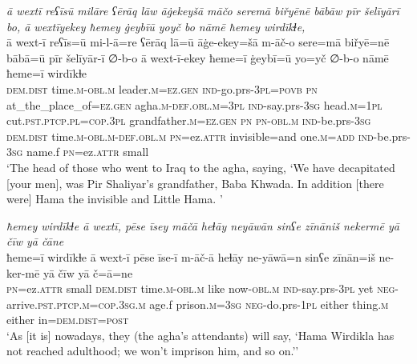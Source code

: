\ea \label{BP.122}
\textit{ā wextī reʕīsū milāre ʕērāq lāw āġekeyšā māčo seremā biřyēnē bābāw pīr šelīyārī bo, ā wextīyekey ħemey ġeybīū yoyč bo nāmē ħemey wirdīkɫe,} \\ 
\gll ā wext-ī reʕīs=ū mi-l-ā=re ʕērāq lā=ū āġe-ekey=šā m-āč-o sere=mā biřyē=nē bābā=ū pīr šelīyār-ī ∅-b-o ā wext-ī-ekey ħeme=ī ġeybī=ū yo=yč ∅-b-o nāmē ħeme=ī wirdīkɫe \\ 
 \textsc{dem.dist} time\textsc{.m}\textsc{-obl}\textsc{.m} leader\textsc{.m}\textsc{=ez.gen} \textsc{ind-}go.prs\textsc{-3pl}\textsc{=\textsc{povb}} \textsc{pn} at\_the\_place\_of\textsc{=ez.gen} agha\textsc{.m}\textsc{-def}\textsc{.obl}\textsc{.m}\textsc{=3pl} \textsc{ind-}say.prs\textsc{-3sg} head\textsc{.m}\textsc{=\textsc{1pl}} cut\textsc{.pst}\textsc{.ptcp}\textsc{.pl}\textsc{=cop}\textsc{.3pl} grandfather\textsc{.m}\textsc{=ez.gen} \textsc{pn} \textsc{pn}\textsc{-obl}\textsc{.m} \textsc{ind-}be.prs\textsc{-3sg} \textsc{dem.dist} time\textsc{.m}\textsc{-obl}\textsc{.m}\textsc{-def}\textsc{.obl}\textsc{.m} \textsc{pn}=ez.\textsc{attr} invisible=and one\textsc{.m}\textsc{=add} \textsc{ind-}be.prs\textsc{-3sg} name.f \textsc{pn}=ez.\textsc{attr} small \\ 
\glt `The head of those who went to Iraq to the agha, saying, ‘We have decapitated [your men], was Pir Shaliyar’s grandfather, Baba Khwada. In addition [there were] Hama the invisible and Little Hama. '
\z 
 
\ea \label{BP.123}
\textit{ħemey wirdīkɫe ā wextī, pēse īsey māčā heɫāy neyāwān sinʕe zīnāniš nekermē yā čīw yā čāne} \\ 
\gll ħeme=ī wirdīkɫe ā wext-ī pēse īse-ī m-āč-ā heɫāy ne-yāwā=n sinʕe zīnān=iš ne-ker-mē yā čīw yā č=ā=ne \\ 
 \textsc{pn}=ez.\textsc{attr} small \textsc{dem.dist} time\textsc{.m}\textsc{-obl}\textsc{.m} like now\textsc{-obl}\textsc{.m} \textsc{ind-}say.prs\textsc{-3pl} yet \textsc{neg-}arrive\textsc{.pst}\textsc{.ptcp}\textsc{.m}\textsc{=cop}\textsc{.3sg}\textsc{.m} age.f prison\textsc{.m}\textsc{=3sg} \textsc{neg-}do.prs\textsc{-\textsc{1pl}} either thing\textsc{.m} either in=\textsc{dem.dist}\textsc{=\textsc{post}} \\ 
\glt `As [it is] nowadays, they (the agha’s attendants) will say, ‘Hama Wirdikla has not reached adulthood; we won’t imprison him, and so on.’'
\z 
 
